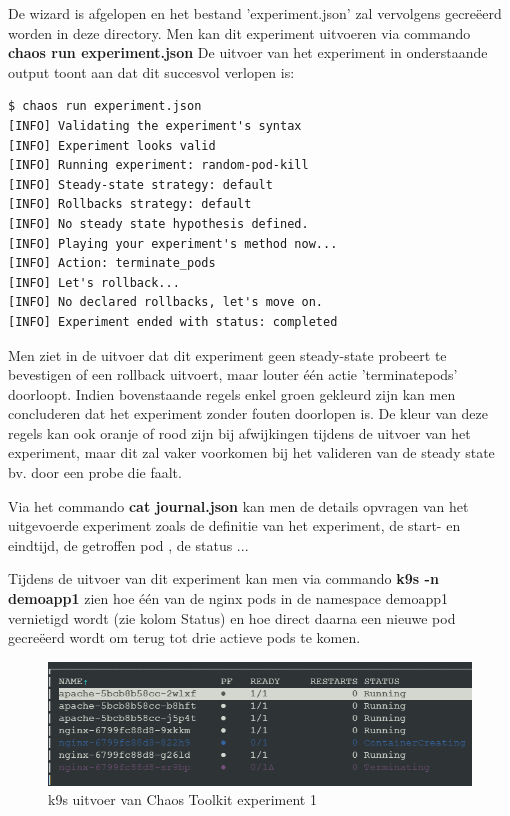 De wizard is afgelopen en het bestand 'experiment.json' zal vervolgens gecreëerd worden in deze directory. Men kan dit experiment uitvoeren via commando {\bf chaos run experiment.json}
De uitvoer van het experiment in onderstaande output toont aan dat dit succesvol verlopen is:
\begin{lstlisting}
$ chaos run experiment.json
[INFO] Validating the experiment's syntax
[INFO] Experiment looks valid
[INFO] Running experiment: random-pod-kill
[INFO] Steady-state strategy: default
[INFO] Rollbacks strategy: default
[INFO] No steady state hypothesis defined. 
[INFO] Playing your experiment's method now...
[INFO] Action: terminate_pods
[INFO] Let's rollback...
[INFO] No declared rollbacks, let's move on.
[INFO] Experiment ended with status: completed
\end{lstlisting}

Men ziet in de uitvoer dat dit experiment geen steady-state probeert te bevestigen of een rollback uitvoert, maar louter één actie 'terminate\textunderscore pods' doorloopt.
Indien bovenstaande regels enkel groen gekleurd zijn kan men concluderen dat het experiment zonder fouten doorlopen is. De kleur van deze regels kan ook oranje of rood zijn bij afwijkingen tijdens de uitvoer van het experiment, maar dit zal vaker voorkomen bij het valideren van de steady state bv. door een probe die faalt.  
 
Via het commando {\bf cat journal.json} kan men de details opvragen van het uitgevoerde experiment zoals de definitie van het experiment, de start- en eindtijd, de getroffen pod , de status ... 

Tijdens de uitvoer van dit experiment kan men via commando {\bf k9s -n demoapp1} zien hoe één van de nginx pods in de namespace demoapp1 vernietigd wordt (zie kolom Status) en hoe direct daarna een nieuwe pod gecreëerd wordt om terug tot drie actieve pods te komen. 

\begin{figure}[h]
    \centering
    \includegraphics{img/k9s-chaostoolkit-ex1.png}
    \caption{k9s uitvoer van Chaos Toolkit experiment 1}
    \label{img:chaostoolkitexperiment1}
\end{figure}

